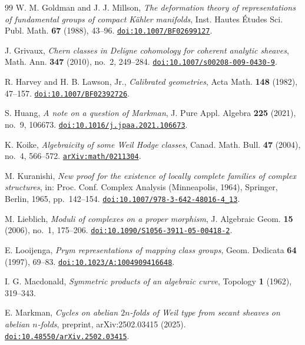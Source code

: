 \begin{thebibliography}{99}
W. M. Goldman and J. J. Millson,
\emph{The deformation theory of representations of fundamental groups of
compact K\"ahler manifolds},
Inst. Hautes \'Etudes Sci. Publ. Math. \textbf{67} (1988), 43--96.
\href{https://doi.org/10.1007/BF02699127}{\texttt{doi:10.1007/BF02699127}}.

J. Grivaux,
\emph{Chern classes in Deligne cohomology for coherent analytic sheaves},
Math. Ann. \textbf{347} (2010), no.~2, 249--284.
\href{https://doi.org/10.1007/s00208-009-0430-9}{\texttt{doi:10.1007/s00208-009-0430-9}}.

R. Harvey and H. B. Lawson, Jr.,
\emph{Calibrated geometries},
Acta Math. \textbf{148} (1982), 47--157.
\href{https://doi.org/10.1007/BF02392726}{\texttt{doi:10.1007/BF02392726}}.

S. Huang,
\emph{A note on a question of Markman},
J. Pure Appl. Algebra \textbf{225} (2021), no.~9, 106673.
\href{https://doi.org/10.1016/j.jpaa.2021.106673}{\texttt{doi:10.1016/j.jpaa.2021.106673}}.

K. Koike,
\emph{Algebraicity of some Weil Hodge classes},
Canad. Math. Bull. \textbf{47} (2004), no.~4, 566--572.
\href{https://arxiv.org/abs/math/0211304}{\texttt{arXiv:math/0211304}}.

M. Kuranishi,
\emph{New proof for the existence of locally complete families of complex
structures},
in: Proc. Conf. Complex Analysis (Minneapolis, 1964),
Springer, Berlin, 1965, pp.~142--154.
\href{https://doi.org/10.1007/978-3-642-48016-4_13}{\texttt{doi:10.1007/978-3-642-48016-4\_13}}.

M. Lieblich,
\emph{Moduli of complexes on a proper morphism},
J. Algebraic Geom. \textbf{15} (2006), no.~1, 175--206.
\href{https://doi.org/10.1090/S1056-3911-05-00418-2}%
{\texttt{doi:10.1090/S1056-3911-05-00418-2}}.

E. Looijenga,
\emph{Prym representations of mapping class groups},
Geom. Dedicata \textbf{64} (1997), 69--83.
\href{https://doi.org/10.1023/A:1004909416648}{\texttt{doi:10.1023/A:1004909416648}}.

I. G. Macdonald,
\emph{Symmetric products of an algebraic curve},
Topology \textbf{1} (1962), 319--343.

E. Markman,
\emph{Cycles on abelian $2n$-folds of Weil type from secant sheaves on abelian
$n$-folds}, preprint, arXiv:2502.03415 (2025).
\href{https://doi.org/10.48550/arXiv.2502.03415}{\texttt{doi:10.48550/arXiv.2502.03415}}.


\end{thebibliography}
